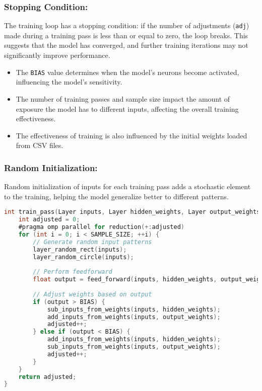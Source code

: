 \documentclass{article}
\begin{document}
\subsubsection*{Stopping Condition:}
The training loop has a stopping condition: if the number of adjustments (\texttt{adj}) made during a training pass is less than or equal to zero, the loop breaks. This suggests that the model has converged, and further training iterations may not significantly improve performance.


\begin{itemize}
    \item The \texttt{BIAS} value determines when the model's neurons become activated, influencing the model's sensitivity.
    \item The number of training passes and sample size impact the amount of exposure the model has to different inputs, affecting the overall training effectiveness.
    \item The effectiveness of training is also influenced by the initial weights loaded from CSV files.
\end{itemize}

\subsubsection*{Random Initialization:}
Random initialization of inputs for each training pass adds a stochastic element to the training, helping the model generalize better to different patterns.

\lstset{language=C, breaklines=true, basicstyle=\ttfamily}
\begin{lstlisting}[language=C, caption={Highlighted train\_pass function}, breaklines=true]
int train_pass(Layer inputs, Layer hidden_weights, Layer output_weights) {
    int adjusted = 0;
    #pragma omp parallel for reduction(+:adjusted)
    for (int i = 0; i < SAMPLE_SIZE; ++i) {
        // Generate random input patterns
        layer_random_rect(inputs);
        layer_random_circle(inputs);
        
        // Perform feedforward
        float output = feed_forward(inputs, hidden_weights, output_weights);
        
        // Adjust weights based on output
        if (output > BIAS) {
            sub_inputs_from_weights(inputs, hidden_weights);
            add_inputs_from_weights(inputs, output_weights);
            adjusted++;
        } else if (output < BIAS) {
            add_inputs_from_weights(inputs, hidden_weights);
            sub_inputs_from_weights(inputs, output_weights);
            adjusted++;
        }
    }
    return adjusted; 
}
\end{lstlisting}
\end{document}
